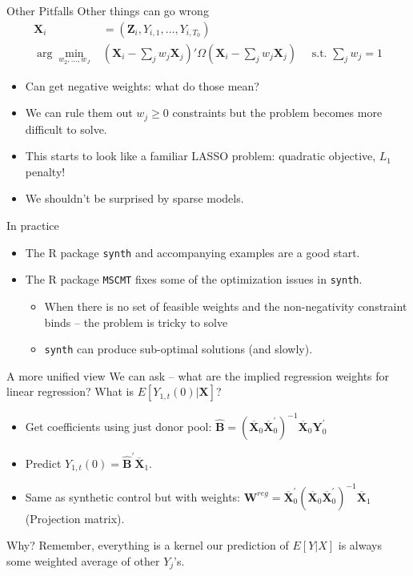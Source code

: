 \documentclass[xcolor=pdftex,dvipsnames,table,mathserif,aspectratio=169]{beamer}
\begin{document}
\begin{frame}{Other Pitfalls}
Other things can go wrong
\begin{align*}
\mathbf{X}_{i}&=\left(\mathbf{Z}_{i}, Y_{i,1},\ldots, Y_{i,T_0} \right)\\
\arg \min_{w_2,\ldots, w_J}&  (\mathbf{X}_{i}-\sum_j w_j \mathbf{X}_{j})' \Omega  (\mathbf{X}_{i}-\sum_j w_j \mathbf{X}_{j}) \quad \text{ s.t. }  \sum_j w_j =1
\end{align*}

\begin{itemize}
\item Can get negative weights: what do those mean? 
\item We can rule them out $w_j \geq 0$ constraints but the problem becomes more difficult to solve.
\item This starts to look like a familiar LASSO problem: quadratic objective, $L_1$ penalty!
\item We shouldn't be surprised by sparse models.
\end{itemize}
\end{frame}

\begin{frame}{In practice}
\begin{itemize}
\item The R package \texttt{synth} and accompanying examples are a good start.
\item The R package \texttt{MSCMT} fixes some of the optimization issues in \texttt{synth}.
\begin{itemize}
\item When there is no set of feasible weights and the non-negativity constraint binds -- the problem is tricky to solve
\item \texttt{synth} can produce sub-optimal solutions (and slowly).
\end{itemize}

\end{itemize}

\end{frame}


\begin{frame}{A more unified view}
We can ask -- what are the implied regression weights for linear regression? What is $E[Y_{1,t}(0) | \mathbf{X}]$?
\begin{itemize}
\item Get coefficients using just donor pool: $\widehat{\boldsymbol{B}}=\left(\overline{\boldsymbol{X}}_{0} \overline{\boldsymbol{X}}_{0}^{\prime}\right)^{-1} \overline{\boldsymbol{X}}_{0} \boldsymbol{Y}_{0}^{\prime}$
\item Predict $Y_{1,t}(0) = \widehat{\boldsymbol{B}}^{\prime} \overline{\boldsymbol{X}}_{1}$.
\item Same as synthetic control but with weights: $\boldsymbol{W}^{r e g}=\overline{\boldsymbol{X}}_{0}^{\prime}\left(\overline{\boldsymbol{X}}_{0} \overline{\boldsymbol{X}}_{0}^{\prime}\right)^{-1} \overline{\boldsymbol{X}}_{1}$ (Projection matrix).
\end{itemize}
Why? Remember, \alert{everything is a kernel} our prediction of $E[Y | X]$ is always some weighted average of other $Y_j$'s.
\end{frame}
\end{document}
